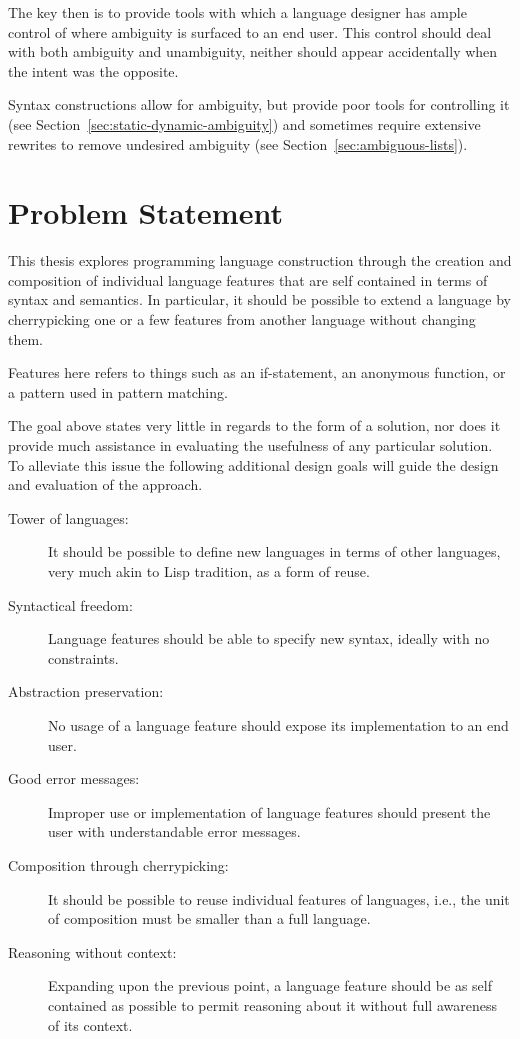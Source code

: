 \documentclass{kththesis}
\begin{document}
The key then is to provide tools with which a language designer has ample control of where ambiguity is surfaced to an end user. This control should deal with both ambiguity and unambiguity, neither should appear accidentally when the intent was the opposite.


Syntax constructions allow for ambiguity, but provide poor tools for controlling it (see Section~\ref{sec:static-dynamic-ambiguity}) and sometimes require extensive rewrites to remove undesired ambiguity (see Section~\ref{sec:ambiguous-lists}).

\section{Problem Statement} \label{sec:research-question}

This thesis explores programming language construction through the creation and composition of individual language features that are self contained in terms of syntax and semantics. In particular, it should be possible to extend a language by cherrypicking one or a few features from another language without changing them.

Features here refers to things such as an if-statement, an anonymous function, or a pattern used in pattern matching.

The goal above states very little in regards to the form of a solution, nor does it provide much assistance in evaluating the usefulness of any particular solution. To alleviate this issue the following additional design goals will guide the design and evaluation of the approach.

\begin{description}
  \item[Tower of languages:] It should be possible to define new languages in terms of other languages, very much akin to Lisp tradition, as a form of reuse.
  \item[Syntactical freedom:] Language features should be able to specify new syntax, ideally with no constraints.
  \item[Abstraction preservation:] No usage of a language feature should expose its implementation to an end user.
  \item[Good error messages:] Improper use or implementation of language features should present the user with understandable error messages.
  \item[Composition through cherrypicking:] It should be possible to reuse individual features of languages, i.e., the unit of composition must be smaller than a full language.
  \item[Reasoning without context:] Expanding upon the previous point, a language feature should be as self contained as possible to permit reasoning about it without full awareness of its context.
\end{description}
\end{document}
